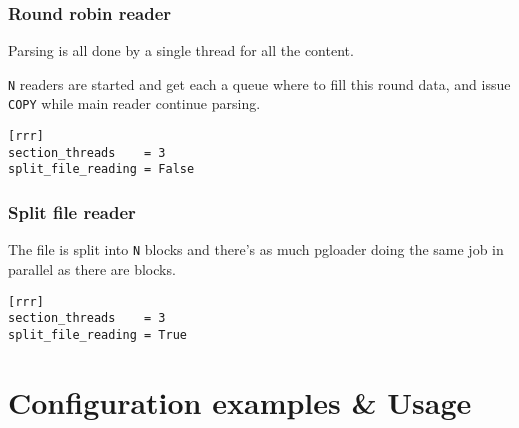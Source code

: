\documentclass{beamer}
\begin{document}

\begin{frame}[fragile]
  \frametitle{Round robin reader}

  Parsing is all done by a single thread for all the content.
  \linebreak
  \pause

  \texttt{N} readers are started and get each a queue where to fill this
  round data, and issue \texttt{COPY} while main reader continue parsing.
  \linebreak
  \pause

  \begin{example}
  \begin{verbatim}
[rrr]
section_threads    = 3
split_file_reading = False
  \end{verbatim}
  \end{example}
\end{frame}

\begin{frame}[fragile]
  \frametitle{Split file reader}

  The file is split into \texttt{N} blocks and there's as much pgloader
  doing the same job in parallel as there are blocks.
  \linebreak
  \pause

  \begin{example}
  \begin{verbatim}
[rrr]
section_threads    = 3
split_file_reading = True
  \end{verbatim}
  \end{example}
\end{frame}

\section{Configuration examples \& Usage}
\end{document}
